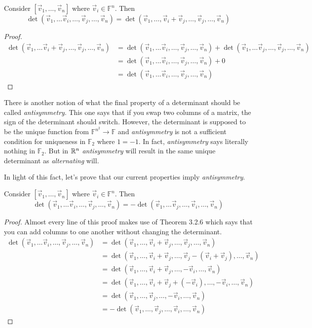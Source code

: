 \begin{theorem}
    Consider $[\vec{v}_1,\dots,\vec{v}_n]$ where $\vec{v}_i\in\mathbb{F}^n$. Then
    $$\det(\vec{v}_1,\dots\vec{v}_i,\dots,\vec{v}_j,\dots,\vec{v}_n)=\det(\vec{v}_1,\dots,\vec{v}_i+\vec{v}_j,\dots,\vec{v}_j,\dots,\vec{v}_n)$$
\end{theorem}
\begin{proof}
    \begin{align*}
        \det(\vec{v}_1,\dots\vec{v}_i+\vec{v}_j,\dots,\vec{v}_j,\dots,\vec{v}_n)&=\det(\vec{v}_1,\dots\vec{v}_i,\dots,\vec{v}_j,\dots,\vec{v}_n)+\det(\vec{v}_1,\dots\vec{v}_j,\dots,\vec{v}_j,\dots,\vec{v}_n)\tag{by multi-linearity}\\
        &=\det(\vec{v}_1,\dots\vec{v}_i,\dots,\vec{v}_j,\dots,\vec{v}_n)+0\tag{by alternating}\\
        &=\det(\vec{v}_1,\dots\vec{v}_i,\dots,\vec{v}_j,\dots,\vec{v}_n)
    \end{align*}
\end{proof}
\begin{remark}
    There is another notion of what the final property of a determinant should be called \textit{antisymmetry}. This one says that if you swap two columns of a matrix, the sign of the determinant should switch. However, the determinant is supposed to be the unique function from $\mathbb{F}^{n^2}\to\mathbb{F}$ and \textit{antisymmetry} is not a sufficient condition for uniqueness in $\mathbb{F}_2$ where $1=-1$. In fact, \textit{antisymmetry} says literally nothing in $\mathbb{F}_2$. But in $\mathbb{R}^n$ \textit{antisymmetry} will result in the same unique determinant as \textit{alternating} will.
\end{remark}
In light of this fact, let's prove that our current properties imply \textit{antisymmetry}.
\begin{theorem}
    Consider $[\vec{v}_1,\dots,\vec{v}_n]$ where $\vec{v}_i\in\mathbb{F}^n$. Then $$\det(\vec{v}_1,\dots\vec{v}_i,\dots,\vec{v}_j,\dots,\vec{v}_n)=-\det(\vec{v}_1,\dots\vec{v}_j,\dots,\vec{v}_i,\dots,\vec{v}_n)$$
\end{theorem}
\begin{proof}
Almost every line of this proof makes use of Theorem 3.2.6 which says that you can add columns to one another without changing the determinant.
    \begin{align*}
        \det(\vec{v}_1,\dots\vec{v}_i,\dots,\vec{v}_j,\dots,\vec{v}_n)&=\det(\vec{v}_1,\dots,\vec{v}_i+\vec{v}_j,\dots,\vec{v}_j,\dots,\vec{v}_n)\\
        &=\det(\vec{v}_1,\dots,\vec{v}_i+\vec{v}_j,\dots,\vec{v}_j-(\vec{v}_i+\vec{v}_j),\dots,\vec{v}_n)\\
        &=\det(\vec{v}_1,\dots,\vec{v}_i+\vec{v}_j,\dots,-\vec{v}_i,\dots,\vec{v}_n)\\
        &=\det(\vec{v}_1,\dots,\vec{v}_i+\vec{v}_j+(-\vec{v}_i),\dots,-\vec{v}_i,\dots,\vec{v}_n)\\
        &=\det(\vec{v}_1,\dots,\vec{v}_j,\dots,-\vec{v}_i,\dots,\vec{v}_n)\\
        &=-\det(\vec{v}_1,\dots,\vec{v}_j,\dots,\vec{v}_i,\dots,\vec{v}_n)\tag{by multi-linearity}
    \end{align*}
\end{proof}
